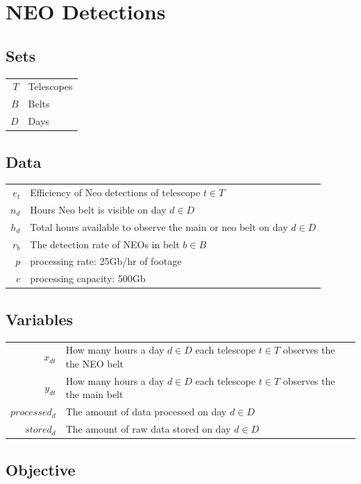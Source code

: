 \documentclass{article}
\begin{document}
	\section*{NEO Detections}
	
	\subsection*{Sets}
	
	\begin{tabular}{rl}
		$T$ & Telescopes\\
		$B$ & Belts\\
		$D$ & Days
	\end{tabular}

	\subsection*{Data}
	
	\begin{tabular}{rl}
		$e_t$ & Efficiency of Neo detections of telescope $t\in T$\\
		$n_d$ & Hours Neo belt is visible on day $d\in D$\\
		$h_d$ & Total hours available to observe the main or neo belt on day $d\in D$\\
		$r_b$ & The detection rate of NEOs in belt $b\in B$\\
		$p$ & processing rate: 25Gb/hr of footage\\
		$c$ & processing capacity: 500Gb\\
	\end{tabular}

	\subsection*{Variables}
	
	\begin{tabular}{rl}
		$x_{dt}$ & How many hours a day $d\in D$ each telescope $t\in T$ observes the the NEO belt\\
		$y_{dt}$ & How many hours a day $d\in D$ each telescope $t\in T$ observes the the main belt\\
		$processed_{d}$ & The amount of data processed on day $d\in D$\\
		$stored_{d}$ & The amount of raw data stored on day $d\in D$
	\end{tabular}

	\subsection*{Objective}
	
\end{document}
